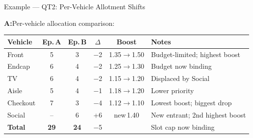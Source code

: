 \documentclass[aspectratio=169,10pt]{beamer}
\begin{document}
\begin{frame}[t]{Example — QT2: Per-Vehicle Allotment Shifts}
\vspace{2pt}
\vspace{4pt}
\small\textbf{\textcolor{lgrn}{A:}}\;Per-vehicle allocation comparison:
\vspace{3pt}
\centering\footnotesize
\renewcommand{\arraystretch}{1.25}
\begin{tabular}{@{} l c c c c l @{}}
\toprule
\textbf{Vehicle} & \textbf{Ep.\,A} & \textbf{Ep.\,B} & \textbf{$\Delta$} & \textbf{Boost} & \textbf{Notes} \\
\midrule
Front    & 5  & 3  & $-$2 & 1.35$\to$1.50 & Budget-limited; highest boost \\
Endcap   & 6  & 4  & $-$2 & 1.25$\to$1.30 & Budget now binding \\
TV       & 6  & 4  & $-$2 & 1.15$\to$1.20 & Displaced by Social \\
Aisle    & 5  & 4  & $-$1 & 1.18$\to$1.20 & Lower priority \\
Checkout & 7  & 3  & $-$4 & 1.12$\to$1.10 & Lowest boost; biggest drop \\
Social   & -- & 6  & \textcolor{lgrn}{+6} & \textcolor{lgrn}{new\,1.40} & New entrant; 2nd highest boost \\
\midrule
\textbf{Total} & \textbf{29} & \textbf{24} & $-$5 & & Slot cap now binding \\
\bottomrule
\end{tabular}
\vspace{4pt}
\end{frame}
\end{document}

